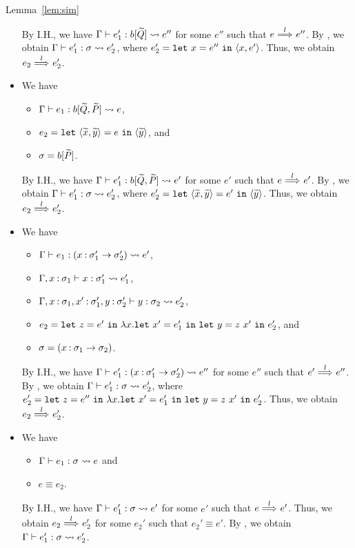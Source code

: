 \begin{pfof}{Lemma~\ref{lem:sim}}
\begin{itemize}
By I.H., we have \(\Gamma \vdash e_1' : b[\widetilde{Q}] \leadsto e''\)  for some \(e''\) such that
\(e \stackrel{l}{\Longrightarrow}_{} e''\).
By , we obtain \(\Gamma \vdash e_1' : \sigma \leadsto e_2'\), where
\(e_2'=\mathtt{let~}x=e''\mathtt{~in~}{\langle{x,e'}\rangle}\).
Thus, we obtain \(e_2 \stackrel{l}{\Longrightarrow}_{} e_2'\).

\item[] 
We have
\begin{itemize}
\item \(\Gamma \vdash e_1 : b[\widetilde{Q},\widetilde{P}] \leadsto e\),
\item \(e_2=\mathtt{let~}\langle{\widetilde{x},\widetilde{y}}\rangle=e\mathtt{~in~}{\langle{\widetilde{y}}\rangle}\), and
\item \(\sigma=b[\widetilde{P}]\).
\end{itemize}

By I.H., we have \(\Gamma \vdash e_1' : b[\widetilde{Q},\widetilde{P}] \leadsto e'\)  for some \(e'\) such that
\(e \stackrel{l}{\Longrightarrow}_{} e'\).
By , we obtain \(\Gamma \vdash e_1' : \sigma \leadsto e_2'\), where
\(e_2'=\mathtt{let~}\langle{\widetilde{x},\widetilde{y}}\rangle=e'\mathtt{~in~}{\langle{\widetilde{y}}\rangle}\).
Thus, we obtain \(e_2 \stackrel{l}{\Longrightarrow}_{} e_2'\).

\item[] 
We have
\begin{itemize}
\item \(\Gamma \vdash e_1 : (x\mathbin{:}\sigma'_1\to\sigma'_2) \leadsto e'\),
\item \(\Gamma,x\mathbin{:}\sigma_1 \vdash x : \sigma'_1 \leadsto e_1'\),
\item \(\Gamma,x\mathbin{:}\sigma_1,x'\mathbin{:}\sigma'_1,y\mathbin{:}\sigma'_2 \vdash y : \sigma_2 \leadsto e_2'\),
\item \(e_2=\mathtt{let~}z=e'\mathtt{~in~}\lambda x.\mathtt{let~}x'=e_1'\mathtt{~in~}\mathtt{let~}y=z\ x'\mathtt{~in~}e_2'\), and
\item \(\sigma=(x\mathbin{:}\sigma_1\to\sigma_2)\).
\end{itemize}

By I.H., we have \(\Gamma \vdash e_1' : (x\mathbin{:}\sigma'_1\to\sigma'_2) \leadsto e''\)  for some \(e''\) such that
\(e' \stackrel{l}{\Longrightarrow}_{} e''\).
By , we obtain \(\Gamma \vdash e_1' : \sigma \leadsto e_2'\), where
\(e_2'=\mathtt{let~}z=e''\mathtt{~in~}\lambda x.\mathtt{let~}x'=e_1'\mathtt{~in~}\mathtt{let~}y=z\ x'\mathtt{~in~}e_2'\).
Thus, we obtain \(e_2 \stackrel{l}{\Longrightarrow}_{} e_2'\).

\item[] 
We have
\begin{itemize}
\item \(\Gamma \vdash e_1 : \sigma \leadsto e\) and
\item \(e \equiv e_2\).
\end{itemize}

By I.H., we have \(\Gamma \vdash e_1' : \sigma \leadsto e'\) for some \(e'\) such that
\(e \stackrel{l}{\Longrightarrow}_{} e'\).
Thus, we obtain \(e_2 \stackrel{l}{\Longrightarrow}_{} e_2'\) for some \(e_2'\) such that \(e_2' \equiv e'\).
By , we obtain \(\Gamma \vdash e_1' : \sigma \leadsto e_2'\).

\end{itemize}
\end{pfof}

